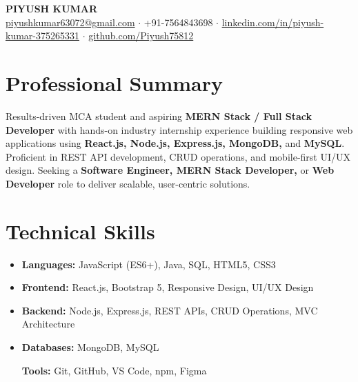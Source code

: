 \documentclass[letterpaper,10pt]{article}
\begin{document}
\begin{center}
  {\Large \textbf{PIYUSH KUMAR}}\\[2pt]
  \small
  \href{mailto:piyushkumar63072@gmail.com}{piyushkumar63072@gmail.com} \;$\cdot$\;
  +91-7564843698 \;$\cdot$\;
  \href{https://linkedin.com/in/piyush-kumar-375265331}{linkedin.com/in/piyush-kumar-375265331} \;$\cdot$\;
  \href{https://github.com/Piyush75812}{github.com/Piyush75812}
\end{center}


\vspace{2pt}

\section{Professional Summary}
\small Results-driven MCA student and aspiring \textbf{MERN Stack / Full Stack Developer} with hands-on industry internship experience building responsive web applications using \textbf{React.js, Node.js, Express.js, MongoDB,} and \textbf{MySQL}. Proficient in REST API development, CRUD operations, and mobile-first UI/UX design. Seeking a \textbf{Software Engineer, MERN Stack Developer,} or \textbf{Web Developer} role to deliver scalable, user-centric solutions.

\vspace{2pt}

\section{Technical Skills}
\small
\begin{itemize}[leftmargin=0pt, label={}, itemsep=0pt, topsep=1pt]
  \item \textbf{Languages:} JavaScript (ES6+), Java, SQL, HTML5, CSS3
  \item \textbf{Frontend:} React.js, Bootstrap 5, Responsive Design, UI/UX Design
  \item \textbf{Backend:} Node.js, Express.js, REST APIs, CRUD Operations, MVC Architecture
  \item \textbf{Databases:} MongoDB, MySQL 
  
   \textbf{Tools:} Git, GitHub, VS Code, npm, Figma
\end{itemize}

\vspace{2pt}

\end{document}
